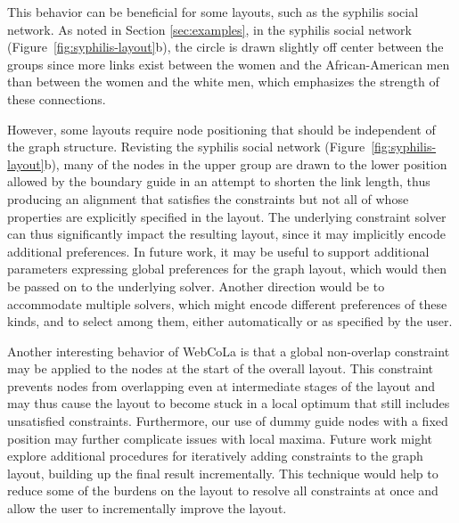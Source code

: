 This behavior can be beneficial for some layouts, such as the syphilis social network.
As noted in Section \ref{sec:examples}, in the syphilis social network
(Figure~\ref{fig:syphilis-layout}b), the circle is drawn slightly off
center between the groups since more links exist between the
women and the African-American men than between the women and
the white men, which emphasizes the strength of these
connections.

However, some layouts require node positioning that should be independent
of the graph structure. Revisting the syphilis social network
(Figure~\ref{fig:syphilis-layout}b), many of the nodes in the upper group
are drawn to the lower position allowed by the boundary guide in an attempt
to shorten the link length, thus producing an alignment that satisfies the
\projectname constraints but not all of whose properties are explicitly
specified in the layout. The underlying constraint solver can thus
significantly impact the resulting layout, since it may implicitly encode
additional preferences.  In future work, it may be useful to support
additional parameters expressing global preferences for the graph layout,
which would then be passed on to the underlying solver.  Another direction
would be to accommodate multiple solvers, which might encode different
preferences of these kinds, and to select among them, either automatically
or as specified by the user.


Another interesting behavior of WebCoLa is that a global non-overlap constraint
may be applied to the nodes at the start of the overall layout. This constraint
prevents nodes from overlapping even at intermediate stages of the layout and
may thus cause the layout to become stuck in a local optimum that still
includes unsatisfied constraints. Furthermore, our use of
dummy guide nodes with a fixed position may further complicate issues
with local maxima. Future work might explore additional procedures for
iteratively adding constraints to the graph layout, building up the final
result incrementally. This technique would help to reduce some of the burdens
on the layout to resolve all constraints at once and allow the user to
incrementally improve the layout.
